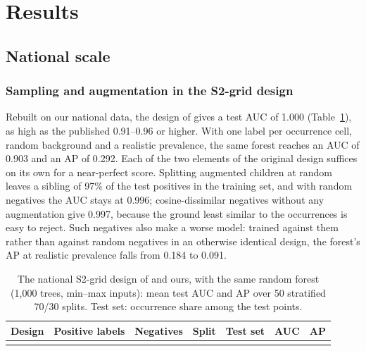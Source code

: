 \documentclass[pdflatex,sn-apa]{sn-jnl}
\begin{document}
\section{Results}\label{sec:results}

\subsection{National scale}\label{sec:res-national}

\subsubsection{Sampling and augmentation in the S2-grid design}\label{sec:res-ladder}

Rebuilt on our national data, the design of \citet{Parsa2024} gives a test AUC of 1.000 (Table~\ref{tab:nat-design}), as high as the published 0.91--0.96 or higher. With one label per occurrence cell, random background and a realistic prevalence, the same forest reaches an AUC of 0.903 and an AP of 0.292. Each of the two elements of the original design suffices on its own for a near-perfect score. Splitting augmented children at random leaves a sibling of 97\% of the test positives in the training set, and with random negatives the AUC stays at 0.996; cosine-dissimilar negatives without any augmentation give 0.997, because the ground least similar to the occurrences is easy to reject. Such negatives also make a worse model: trained against them rather than against random negatives in an otherwise identical design, the forest's AP at realistic prevalence falls from 0.184 to 0.091.

\begin{table}[t]
\caption{The national S2-grid design of \citet{Parsa2024} and ours, with the same random forest (1,000 trees, min--max inputs): mean test AUC and AP over 50 stratified 70/30 splits. Test set: occurrence share among the test points.}\label{tab:nat-design}
\scriptsize
\setlength{\tabcolsep}{2.5pt}
\begin{tabular*}{\textwidth}{@{\extracolsep\fill}>{\raggedright\arraybackslash}p{1.8cm}>{\raggedright\arraybackslash}p{2.6cm}>{\raggedright\arraybackslash}p{2.7cm}>{\raggedright\arraybackslash}p{1.9cm}>{\raggedright\arraybackslash}p{1.4cm}cc}
\toprule
Design & Positive labels & Negatives & Split & Test set & AUC & AP \\
\midrule
\botrule
\end{tabular*}
\end{table}
\end{document}
